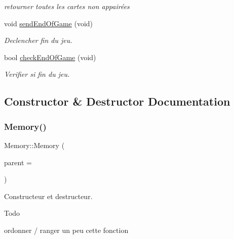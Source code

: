\begin{DoxyCompactItemize}
\begin{DoxyCompactList}\small\item\em retourner toutes les cartes non appairées \end{DoxyCompactList}\item 
\mbox{\label{class_memory_aee5f2b150b3b90ba1dd6ba7bf1b671a2}} 
void \hyperlink{class_memory_aee5f2b150b3b90ba1dd6ba7bf1b671a2}{send\+End\+Of\+Game} (void)
\begin{DoxyCompactList}\small\item\em Declencher fin du jeu. \end{DoxyCompactList}\item 
\mbox{\label{class_memory_abfb41c91c7dd6166088a38b0689bc5e5}} 
bool \hyperlink{class_memory_abfb41c91c7dd6166088a38b0689bc5e5}{check\+End\+Of\+Game} (void)
\begin{DoxyCompactList}\small\item\em Verifier si fin du jeu. \end{DoxyCompactList}\end{DoxyCompactItemize}


\subsection{Constructor \& Destructor Documentation}
\mbox{\label{class_memory_a243eef3e0fd8d02131e3bcca0471c931}} 
\subsubsection{\texorpdfstring{Memory()}{Memory()}}
{\footnotesize\ttfamily Memory\+::\+Memory (\begin{DoxyParamCaption}\item[{Q\+Widget $\ast$}]{parent = {} }\end{DoxyParamCaption})\hspace{0.3cm}{\ttfamily [explicit]}}



Constructeur et destructeur. 

\begin{DoxyRefDesc}{Todo}
\item[\hyperlink{todo__todo000001}{Todo}]ordonner / ranger un peu cette fonction \end{DoxyRefDesc}



